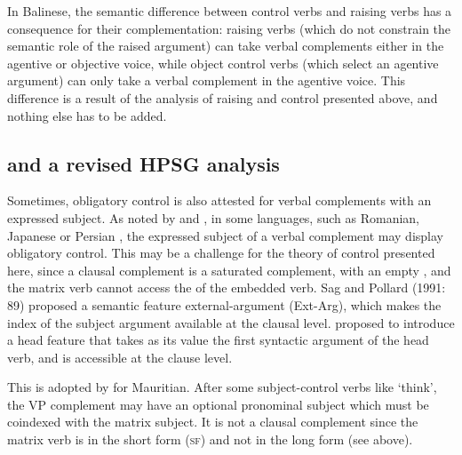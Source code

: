 \documentclass[output=paper
	        ,collection
	        ,collectionchapter
 	        ,biblatex
                ,babelshorthands
                ,newtxmath
                ,draftmode
                ,colorlinks, citecolor=brown
]{langscibook}
\begin{document}
In Balinese, the semantic difference between control verbs and raising verbs has a consequence for their complementation: raising verbs (which do not constrain the semantic role of the raised argument) can take verbal complements either in the agentive or objective voice, while object control verbs (which select an agentive argument) can only take a verbal complement in the agentive voice. This difference is a result of the analysis of raising and control presented above, and nothing else has to be added.


\subsection{\xarg and a revised HPSG analysis}

Sometimes, obligatory control is also attested for verbal complements with an expressed subject. 
As noted by \citet{Zec87a-u,Farkas1988} and \citet[--116]{GH2000a-u}, in some languages,  such as Romanian, Japanese  \citep{Kuno76a-u,Iida96a-u} or Persian \citep{Karimi2008},  the expressed subject of a verbal complement
may display obligatory control. This may be a challenge for the theory of control presented here, since a clausal complement is a
saturated complement, with an empty \subjl, and the matrix verb cannot access the \subjv of the
embedded verb. Sag and Pollard (1991: 89) proposed a semantic feature external-argument (Ext-Arg), which makes the index of the subject argument available at the clausal level.  \citet{Sag2007a} proposed to introduce a head
feature \xarg that takes as its value the first syntactic argument of the head verb, and is
accessible at the clause level. 

This is adopted by \citet{HenriandLaurens2011} for Mauritian.  After some subject-control verbs
like  `think', the VP complement may have an optional pronominal subject which must be coindexed with the matrix subject. It is not a clausal complement since the matrix verb is in the short form (\textsc{sf}) and not in the long form (see above).
\end{document}
